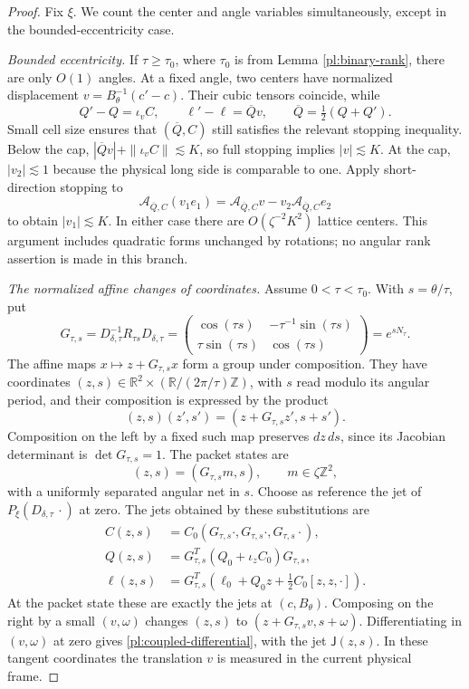 \documentclass[11pt]{amsart}
\theoremstyle{definition}
\theoremstyle{remark}
\newcommand{\R}{\mathbb R}
\numberwithin{equation}{section}
\begin{document}
\begin{proof}
Fix $\xi$. We count the center and angle variables simultaneously, except in the bounded-eccentricity case.

\emph{Bounded eccentricity.} If $\tau\ge\tau_0$, where $\tau_0$ is from Lemma \ref{pl:binary-rank}, there are only $O(1)$ angles. At a fixed angle, two centers have normalized displacement $v=B_\theta^{-1}(c'-c)$. Their cubic tensors coincide, while
\[
Q'-Q=\iota_vC,\qquad \ell'-\ell=\overline Qv,
\qquad \overline Q=\tfrac12(Q+Q').
\]
Small cell size ensures that $(\overline Q,C)$ still satisfies the relevant stopping inequality. Below the cap, $|\overline Qv|+\|\iota_vC\|\lesssim K$, so full stopping implies $|v|\lesssim K$. At the cap, $|v_2|\lesssim1$ because the physical long side is comparable to one. Apply short-direction stopping to
\[
\mathcal A_{\overline Q,C}(v_1e_1)
=\mathcal A_{\overline Q,C}v-v_2\mathcal A_{\overline Q,C}e_2
\]
to obtain $|v_1|\lesssim K$. In either case there are $O(\zeta^{-2}K^2)$ lattice centers. This argument includes quadratic forms unchanged by rotations; no angular rank assertion is made in this branch.

\emph{The normalized affine changes of coordinates.} Assume $0<\tau<\tau_0$. With $s=\theta/\tau$, put
\begin{equation}\label{pl:G-tau}
G_{\tau,s}=D_{\delta,\tau}^{-1}R_{\tau s}D_{\delta,\tau}
=\begin{pmatrix}
\cos(\tau s)&-\tau^{-1}\sin(\tau s)\\
\tau\sin(\tau s)&\cos(\tau s)
\end{pmatrix}=e^{sN_\tau}.
\end{equation}
The affine maps $x\mapsto z+G_{\tau,s}x$ form a group under composition. They have coordinates $(z,s)\in\R^2\times(\R/(2\pi/\tau)\mathbb Z)$, with $s$ read modulo its angular period, and their composition is expressed by the product
\[
(z,s)(z',s')=(z+G_{\tau,s}z',s+s').
\]
Composition on the left by a fixed such map preserves $dz\,ds$, since its Jacobian determinant is $\det G_{\tau,s}=1$. The packet states are
\[
(z,s)=(G_{\tau,s}m,s),\qquad m\in\zeta\mathbb Z^2,
\]
with a uniformly separated angular net in $s$. Choose as reference the jet of $P_\xi(D_{\delta,\tau}\,\cdot)$ at zero. The jets obtained by these substitutions are
\begin{align}
C(z,s)&=C_0(G_{\tau,s}\cdot,G_{\tau,s}\cdot,G_{\tau,s}\cdot),\label{pl:orbit-C}\\
Q(z,s)&=G_{\tau,s}^T(Q_0+\iota_zC_0)G_{\tau,s},\label{pl:orbit-Q}\\
\ell(z,s)&=G_{\tau,s}^T\left(\ell_0+Q_0z+\tfrac12C_0[z,z,\cdot]\right).\label{pl:orbit-L}
\end{align}
At the packet state these are exactly the jets at $(c,B_\theta)$. Composing on the right by a small $(v,\omega)$ changes $(z,s)$ to $(z+G_{\tau,s}v,s+\omega)$. Differentiating in $(v,\omega)$ at zero gives \eqref{pl:coupled-differential}, with the jet $\mathsf J(z,s)$. In these tangent coordinates the translation $v$ is measured in the current physical frame.


\end{proof}
\end{document}
